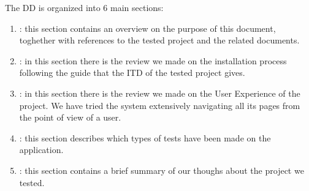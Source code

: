 The DD is organized into 6 main sections:

\begin{enumerate}
\item {\textbf{}}: this section contains an overview on the purpose of this document, toghether with references to the tested project and the related documents.
\item {\textbf{}}: in this section there is the review we made on the installation process following the guide that the ITD of the tested project gives. 
\item {\textbf{}}: in this section there is the review we made on the User Experience of the project. We have tried the system extensively navigating all its pages from the point of view of a user.
\item {\textbf{}}: this section describes which types of tests have been made on the application.
\item {\textbf{}}: this section contains a brief summary of our thoughs about the project we tested.
\end{enumerate}